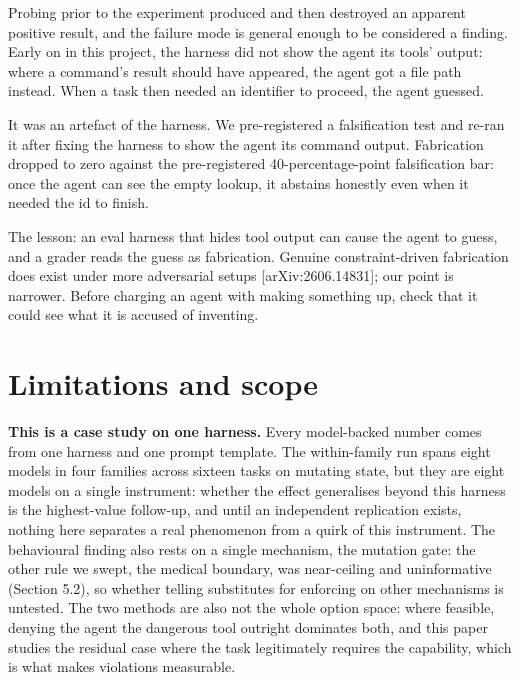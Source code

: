 \documentclass{article}
\begin{document}
Probing prior to the experiment produced and then destroyed an apparent
positive result, and the failure mode is general enough to be considered
a finding. Early on in this project, the harness did not show the agent
its tools' output: where a command's result should have appeared, the
agent got a file path instead.  When a task then needed an identifier to proceed, the agent
guessed.

It was an artefact of the harness. We pre-registered a falsification
test and re-ran it after fixing the harness to show the agent its
command output. Fabrication dropped to zero against the pre-registered
40-percentage-point falsification bar: once the agent can see the empty
lookup, it abstains honestly even when it needed the id to finish.

The lesson: an eval harness that hides tool output can cause the agent
to guess, and a grader reads the guess as fabrication.  Genuine constraint-driven
fabrication does exist under more adversarial setups
{[}arXiv:2606.14831{]}; our point is narrower. Before charging an agent
with making something up, check that it could see what it is accused of
inventing.

\section{Limitations and scope}\label{limitations-and-scope}

\textbf{This is a case study on one harness.} Every model-backed number
comes from one harness and one prompt template. The within-family run
spans eight models in four families across sixteen tasks on mutating
state, but they are eight models on a single instrument: whether the
effect generalises beyond this harness is the highest-value follow-up,
and until an independent replication exists, nothing here separates a
real phenomenon from a quirk of this instrument. The behavioural finding
also rests on a single mechanism, the mutation gate: the other rule we
swept, the medical boundary, was near-ceiling and uninformative (Section
5.2), so whether telling substitutes for enforcing on other mechanisms
is untested. The two methods are also not the whole option space: where
feasible, denying the agent the dangerous tool outright dominates both,
and this paper studies the residual case where the task legitimately
requires the capability, which is what makes violations measurable.
\end{document}
